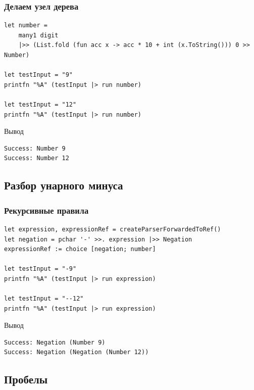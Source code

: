 \documentclass[xetex,mathserif,serif]{beamer}
\begin{document}
    \begin{frame}[fragile]
        \frametitle{Делаем узел дерева}
        \begin{verbatim}
let number = 
    many1 digit 
    |>> (List.fold (fun acc x -> acc * 10 + int (x.ToString())) 0 >> Number)

let testInput = "9"
printfn "%A" (testInput |> run number)

let testInput = "12"
printfn "%A" (testInput |> run number)
        \end{verbatim}

        \begin{exampleblock}{Вывод}
            \begin{verbatim}
Success: Number 9
Success: Number 12
            \end{verbatim}
        \end{exampleblock}
    \end{frame}

    \subsection{Разбор унарного минуса}

    \begin{frame}[fragile]
        \frametitle{Рекурсивные правила}
        \begin{verbatim}
let expression, expressionRef = createParserForwardedToRef()
let negation = pchar '-' >>. expression |>> Negation
expressionRef := choice [negation; number]

let testInput = "-9"
printfn "%A" (testInput |> run expression)

let testInput = "--12"
printfn "%A" (testInput |> run expression)
        \end{verbatim}

        \begin{exampleblock}{Вывод}
            \begin{verbatim}
Success: Negation (Number 9)
Success: Negation (Negation (Number 12))
            \end{verbatim}
        \end{exampleblock}
    \end{frame}

    \subsection{Пробелы}
\end{document}
